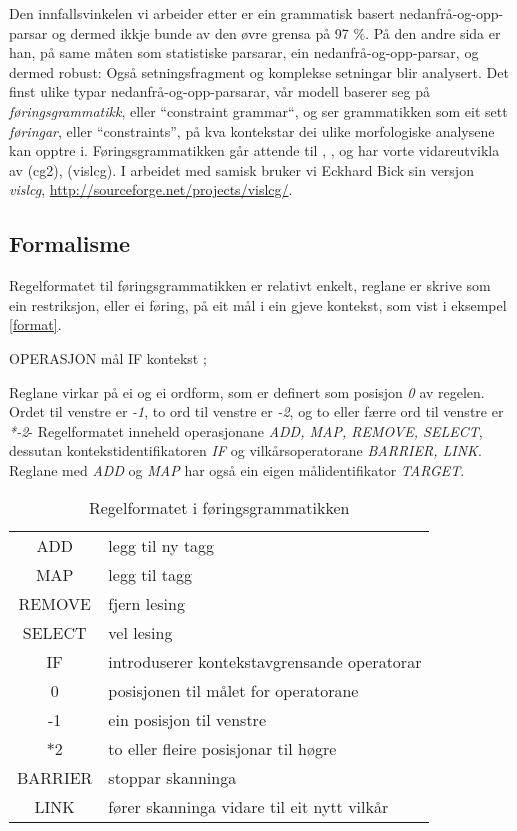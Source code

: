\documentclass[a4paper,norsk]{article}
\begin{document}
Den innfallsvinkelen vi arbeider etter er ein grammatisk basert nedanfrå-og-opp-parsar og dermed ikkje bunde av den øvre grensa på 97 \%. På den andre sida er han, på same måten som statistiske parsarar, ein nedanfrå-og-opp-parsar, og dermed robust: Også setningsfragment og komplekse setningar blir analysert. Det finst ulike typar nedanfrå-og-opp-parsarar, vår modell baserer seg på \emph{føringsgrammatikk}, eller ``constraint grammar``, og ser grammatikken som eit sett \emph{føringar}, eller ``constraints'', på kva kontekstar dei ulike morfologiske analysene kan opptre i. Føringsgrammatikken går attende til \citet{Karlsson90}, \citet{Karlsson95}, og har vorte vidareutvikla av \citet{Tapanainen96} (cg2), \citet{Bick00} (vislcg). I arbeidet med samisk bruker vi Eckhard Bick sin versjon \emph{vislcg}, \url{http://sourceforge.net/projects/vislcg/}.%

\subsection{Formalisme}

Regelformatet til føringsgrammatikken er relativt enkelt, reglane er skrive som ein restriksjon, eller ei føring, på eit mål i ein gjeve kontekst, som vist i eksempel \ref{format}. %

\begin{example}\label{format}
OPERASJON mål IF kontekst ;
\end{example}

Reglane virkar på ei og ei ordform, som er definert som posisjon \emph{0} av regelen. Ordet til venstre er \emph{-1}, to ord til venstre er \emph{-2}, og to eller færre ord til venstre er \emph{*-2}- Regelformatet inneheld operasjonane \emph{ADD, MAP, REMOVE, SELECT}, dessutan kontekstidentifikatoren \emph{IF} og vilkårsoperatorane \emph{BARRIER, LINK}. Reglane med \emph{ADD} og \emph{MAP} har også ein eigen målidentifikator \emph{TARGET}.%

\begin{table}[htdp]
\caption{Regelformatet i føringsgrammatikken}
\begin{center}
\begin{tabular}{|c|l|}
\hline
 ADD & legg til ny tagg \\
 MAP & legg til tagg \\
 REMOVE & fjern lesing \\
 SELECT & vel lesing \\
\hline 
 IF & introduserer kontekstavgrensande operatorar \\
\hline 
 0 & posisjonen til målet for operatorane \\
 -1 & ein posisjon til venstre \\
 $\ast2$ & to eller fleire posisjonar til høgre \\
\hline 
 BARRIER & stoppar skanninga \\
 LINK & fører skanninga vidare til eit nytt vilkår \\
\hline 
\end{tabular}
\end{center}
\label{default}
\end{table}%
\end{document}
